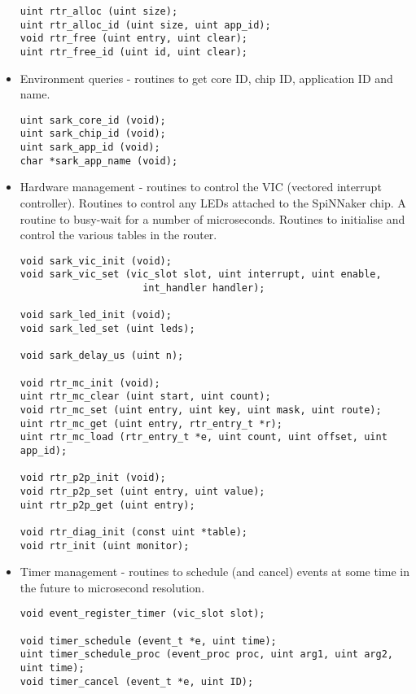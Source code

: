\begin{itemize}
\begin{lstlisting}
uint rtr_alloc (uint size);
uint rtr_alloc_id (uint size, uint app_id);
void rtr_free (uint entry, uint clear);
uint rtr_free_id (uint id, uint clear);
\end{lstlisting}

\item
Environment queries - routines to get core ID, chip ID, application
ID and name.

\lstset{language=C}
\begin{lstlisting}
uint sark_core_id (void);
uint sark_chip_id (void);
uint sark_app_id (void);
char *sark_app_name (void);
\end{lstlisting}

\item
Hardware management - routines to control the VIC (vectored interrupt
controller). Routines to control any LEDs attached to the SpiNNaker
chip. A routine to busy-wait for a number of microseconds. Routines to
initialise and control the various tables in the router.

\lstset{language=C}
\begin{lstlisting}
void sark_vic_init (void);
void sark_vic_set (vic_slot slot, uint interrupt, uint enable,
                     int_handler handler);

void sark_led_init (void);
void sark_led_set (uint leds);

void sark_delay_us (uint n);

void rtr_mc_init (void);
uint rtr_mc_clear (uint start, uint count);
void rtr_mc_set (uint entry, uint key, uint mask, uint route);
uint rtr_mc_get (uint entry, rtr_entry_t *r);
uint rtr_mc_load (rtr_entry_t *e, uint count, uint offset, uint app_id);

void rtr_p2p_init (void);
void rtr_p2p_set (uint entry, uint value);
uint rtr_p2p_get (uint entry);

void rtr_diag_init (const uint *table);
void rtr_init (uint monitor);
\end{lstlisting}

\item
Timer management - routines to schedule (and cancel) events at some
time in the future to microsecond resolution.

\lstset{language=C}
\begin{lstlisting}
void event_register_timer (vic_slot slot);

void timer_schedule (event_t *e, uint time);
uint timer_schedule_proc (event_proc proc, uint arg1, uint arg2, uint time);
void timer_cancel (event_t *e, uint ID);
\end{lstlisting}


\end{itemize}
